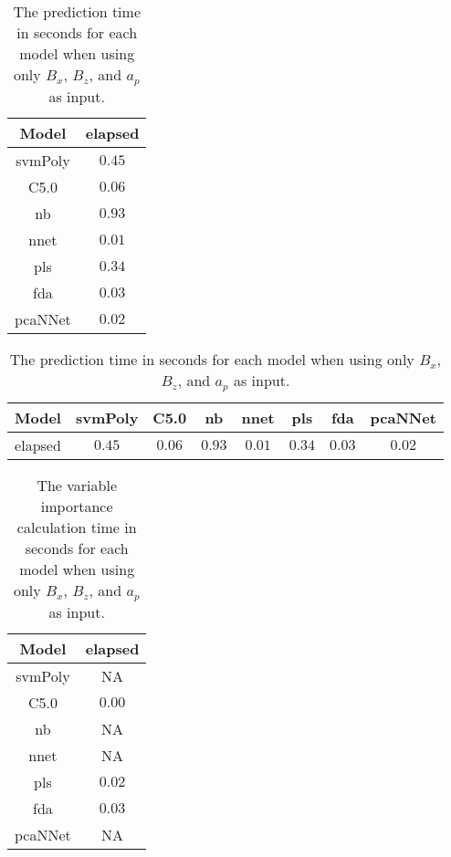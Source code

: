 \begin{table}[!ht]
	\centering
	\begin{tabular}{|c|c|}
		\hline
		Model & elapsed \\ \hline
		svmPoly & $0.45$ \\ \hline
		C5.0 & $0.06$ \\ \hline
		nb & $0.93$ \\ \hline
		nnet & $0.01$ \\ \hline
		pls & $0.34$ \\ \hline
		fda & $0.03$ \\ \hline
		pcaNNet & $0.02$ \\ \hline
	\end{tabular}
	\caption{The prediction time in seconds for each model when using only $B_{x}$, $B_{z}$, and $a_{p}$ as input.}
	\label{tab:time:xzap:predict}
\end{table}

\begin{table}[!ht]
	\centering
	\begin{tabular}{|c|c|c|c|c|c|c|c|}
		\hline
		Model & svmPoly & C5.0 & nb & nnet & pls & fda & pcaNNet \\ \hline
		elapsed & $0.45$ & $0.06$ & $0.93$ & $0.01$ & $0.34$ & $0.03$ & $0.02$ \\ \hline
	\end{tabular}
	\caption{The prediction time in seconds for each model when using only $B_{x}$, $B_{z}$, and $a_{p}$ as input.}
	\label{tab:time:reverse:xzap:predict}
\end{table}

\begin{table}[!ht]
	\centering
	\begin{tabular}{|c|c|}
		\hline
		Model & elapsed \\ \hline
		svmPoly & NA \\ \hline
		C5.0 & $0.00$ \\ \hline
		nb & NA \\ \hline
		nnet & NA \\ \hline
		pls & $0.02$ \\ \hline
		fda & $0.03$ \\ \hline
		pcaNNet & NA \\ \hline
	\end{tabular}
	\caption{The variable importance calculation time in seconds for each model when using only $B_{x}$, $B_{z}$, and $a_{p}$ as input.}
	\label{tab:time:xzap:importance}
\end{table}

